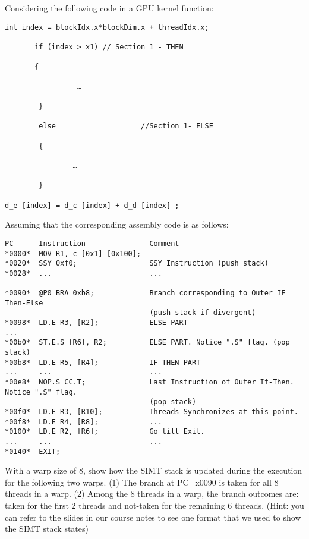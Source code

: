 \documentclass[11pt]{article}
\begin{document}
\section{}

Considering the following code in a GPU kernel function:

\begin{verbatim}
int index = blockIdx.x*blockDim.x + threadIdx.x;

       if (index > x1) // Section 1 - THEN

       {   

                 …  

        }

        else                    //Section 1- ELSE

        {

                …

        }              

d_e [index] = d_c [index] + d_d [index] ;
\end{verbatim}

Assuming that the corresponding assembly code is as follows:

\begin{verbatim}
PC      Instruction               Comment
*0000*  MOV R1, c [0x1] [0x100];
*0020*  SSY 0xf0;                 SSY Instruction (push stack)
*0028*  ...                       ...
                                    
*0090*  @P0 BRA 0xb8;             Branch corresponding to Outer IF Then-Else 
                                  (push stack if divergent)
*0098*  LD.E R3, [R2];            ELSE PART
...
*00b0*  ST.E.S [R6], R2;          ELSE PART. Notice ".S" flag. (pop stack)
*00b8*  LD.E R5, [R4];            IF THEN PART
...     ...                       ...
*00e8*  NOP.S CC.T;               Last Instruction of Outer If-Then. Notice ".S" flag. 
                                  (pop stack)
*00f0*  LD.E R3, [R10];           Threads Synchronizes at this point.
*00f8*  LD.E R4, [R8];            ...
*0100*  LD.E R2, [R6];            Go till Exit.
...     ...                       ...
*0140*  EXIT;
\end{verbatim}
With a warp size of 8, show how the SIMT stack is updated during the execution for the following two warps. (1) The branch at PC=x0090 is taken for all 8 threads in a warp. (2) Among the 8 threads in a warp, the branch outcomes are: taken for the first 2 threads and not-taken for the remaining 6 threads. (Hint: you can refer to the slides in our course notes to see one format that we used to show the SIMT stack states)


\begin{Answer}
\end{Answer}

\newpage
\end{document}
